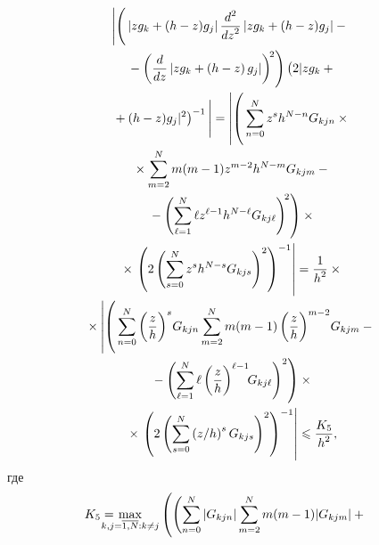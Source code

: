 \begin{multicols}{2}
\noindent
 \begin{multline*}
 \left\vert 
 \left(
 \vphantom{\left(\fr{d}{dz}  \left\vert z g_k+\left(h-z\right)g_j\right\vert \right)^{\!2}}
\left\vert z g_k+(h-z)g_j\right\vert \fr{d^2}{dz^2}
 \left\vert z g_k+(h-z)g_j\right\vert -{}\right.\right.\\
\left. {}-\left(\fr{d}{dz}
 \left\vert z g_k+\left(h-
z\right)g_j\right\vert \right)^{\!2}
\right)\left(
\vphantom{(h-z)g_j|^2}
2|z g_k+{}\right.\\
\left.\left.{}+(h-z)g_j|^2\right)^{-1} 
\vphantom{\left(\left(\fr{d}{dz}\right)  \left\vert z g_k+\left(h-z\right)g_j\right\vert \right)^{\!2}}
\right\vert= 
\left|
\left(
\vphantom{\left(\left(\sum\limits_{\ell=1}^N\ell z^{\ell-1}h^{N-
\ell}G_{kj\ell}\right)^{\!2}\right)^{-1}}
\sum\limits_{n=0}^Nz^sh^{N-n}G_{kjn}\times{}\right.\right.\\
{}\times\sum\limits_{m=2}^Nm(m-1)z^{m-2}h^{N-m}G_{kjm} -{}\\
\left.{}- \left(\sum\limits_{\ell=1}^N\ell z^{\ell-1}h^{N-\ell}
G_{kj\ell}\right)^{\!2}\right)\times{}\\
{}\times
\left.\left(2\left(\sum\limits_{s=0}^Nz^sh^{N-s}G_{kjs}\right)^2\right)^{-1}
\right| = \fr{1}{h^2}\times{}\\
{}\times
\left|
\left( 
\vphantom{\left(\left(\sum\limits_{\ell=1}^N\ell z^{\ell-1}h^{N-
\ell}G_{kj\ell}\right)^{\!2}\right)^{-1}}
\sum\limits_{n=0}^N\left(\fr{z}{h}\right)^s \hspace*{-1.5pt}G_{kjn}
\sum\limits_{m=2}^Nm(m-1)\left(\fr{z}{h}\right)^{m-2}\hspace*{-1.5pt}G_{kjm} - {}\right.\right.\\
\left.{}-\left(\sum\limits_{\ell=1}^N \ell \left(\fr{z}{h}\right)^{\ell-1}\!\!
G_{kj\ell}\right)^2
\right)\times{}\\
{}\times
\left.\left(2\left(\sum\limits_{s=0}^N\left({z}/{h}\right)^sG_{kjs}\right)^2\right)^{-1}
 \right| \leqslant \fr{K_5}{h^2},
 \end{multline*}
 где
 \begin{multline*}
 \hspace*{-7.7pt}K_5 = \hspace*{-13pt}\max\limits_{%
 {k,j=\overline{1,N}:} %
 {k \neq j}}
\left(
\vphantom{\left(\sum\limits_{\ell=1}^N\ell |G_{kj\ell}|\right)^2}
\!\left( 
\sum\limits_{n=0}^N|G_{kjn}|\sum\limits_{m=2}^Nm(m-1)|G_{kjm}| + {}\right.\right.\vspace*{-3pt}\\

\end{multline*}
\end{multicols}
